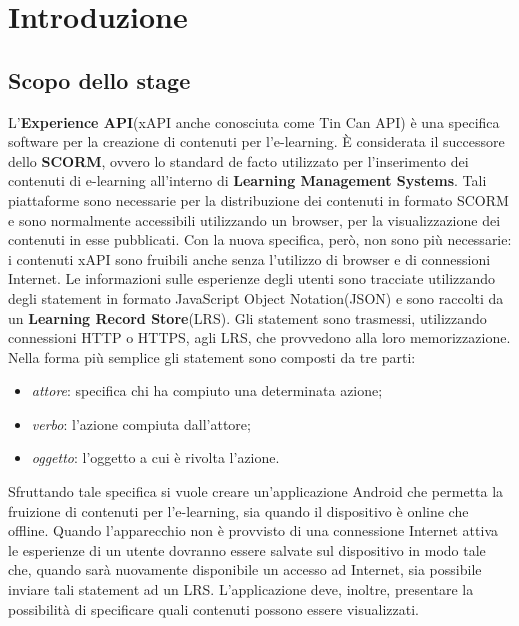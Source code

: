 \documentclass[../Tesi.tex]{subfiles}
\begin{document}
\section{Introduzione}
	
	\subsection{Scopo dello stage}
		L'\textbf{Experience API}(xAPI anche conosciuta come Tin Can API) è una specifica software per la creazione di contenuti per l'e-learning. È considerata il successore dello \textbf{SCORM}, ovvero lo standard de facto utilizzato per l'inserimento dei contenuti di e-learning all'interno di \textbf{Learning Management Systems}. Tali piattaforme sono necessarie per la distribuzione dei contenuti in formato SCORM e sono normalmente accessibili utilizzando un browser, per la visualizzazione dei contenuti in esse pubblicati. Con la nuova specifica, però, non sono più necessarie: i contenuti xAPI sono fruibili anche senza l'utilizzo di browser e di connessioni Internet. Le informazioni sulle esperienze degli utenti sono tracciate utilizzando degli statement in formato JavaScript Object Notation(JSON) e sono raccolti da un \textbf{Learning Record Store}(LRS). Gli statement sono trasmessi, utilizzando connessioni HTTP o HTTPS, agli LRS, che provvedono alla loro memorizzazione. Nella forma più semplice gli statement sono composti da tre parti: 
		\begin{itemize}
			\item \textit{attore}: specifica chi ha compiuto una determinata azione;
			\item \textit{verbo}: l'azione compiuta dall'attore;
			\item \textit{oggetto}: l'oggetto a cui è rivolta l'azione.
		\end{itemize}
		Sfruttando tale specifica si vuole creare un'applicazione Android che permetta la fruizione di contenuti per l'e-learning, sia quando il dispositivo è online che offline. Quando l'apparecchio non è provvisto di una connessione Internet attiva le esperienze di un utente dovranno essere salvate sul dispositivo in modo tale che, quando sarà nuovamente disponibile un accesso ad Internet, sia possibile inviare tali statement ad un LRS. L'applicazione deve, inoltre, presentare la possibilità di specificare quali contenuti possono essere visualizzati.
\end{document}
